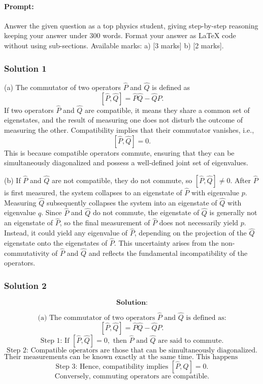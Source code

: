 \documentclass{article}
\begin{document}
\paragraph{Prompt: \\} 
Answer the given question as a top physics student, giving step-by-step reasoning keeping your answer under 300 words. Format your answer as LaTeX code without using sub-sections. Available marks: a) [3 marks] b) [2 marks].

\subsubsection{Solution 1}

(a) The commutator of two operators $\hat{P}$ and $\hat{Q}$ is defined as 
\[
[\hat{P}, \hat{Q}] = \hat{P}\hat{Q} - \hat{Q}\hat{P}.
\]
If two operators $\hat{P}$ and $\hat{Q}$ are compatible, it means they share a common set of eigenstates, and the result of measuring one does not disturb the outcome of measuring the other. Compatibility implies that their commutator vanishes, i.e., 
\[
[\hat{P}, \hat{Q}] = 0.
\]
This is because compatible operators commute, ensuring that they can be simultaneously diagonalized and possess a well-defined joint set of eigenvalues.

(b) If $\hat{P}$ and $\hat{Q}$ are not compatible, they do not commute, so $[\hat{P}, \hat{Q}] \neq 0$. After $\hat{P}$ is first measured, the system collapses to an eigenstate of $\hat{P}$ with eigenvalue $p$. Measuring $\hat{Q}$ subsequently collapses the system into an eigenstate of $\hat{Q}$ with eigenvalue $q$. Since $\hat{P}$ and $\hat{Q}$ do not commute, the eigenstate of $\hat{Q}$ is generally not an eigenstate of $\hat{P}$, so the final measurement of $\hat{P}$ does not necessarily yield $p$. Instead, it could yield any eigenvalue of $\hat{P}$, depending on the projection of the $\hat{Q}$ eigenstate onto the eigenstates of $\hat{P}$. This uncertainty arises from the non-commutativity of $\hat{P}$ and $\hat{Q}$ and reflects the fundamental incompatibility of the operators.

\subsubsection{Solution 2}
\[
\textbf{Solution:}
\]

\[
\text{(a) The commutator of two operators }\hat{P}\text{ and }\hat{Q}\text{ is defined as:}
\]
\[
[\hat{P}, \hat{Q}] = \hat{P}\hat{Q} - \hat{Q}\hat{P}.
\]
\[
\text{Step 1: If }[\hat{P}, \hat{Q}] = 0,\text{ then }\hat{P}\text{ and }\hat{Q}\text{ are said to commute.}
\]
\[
\text{Step 2: Compatible operators are those that can be simultaneously diagonalized.}
\]
\[
\text{Their measurements can be known exactly at the same time. This happens precisely when they commute.}
\]
\[
\text{Step 3: Hence, compatibility implies }[\hat{P}, \hat{Q}] = 0.
\]
\[
\text{Conversely, commuting operators are compatible.}
\]
\end{document}
